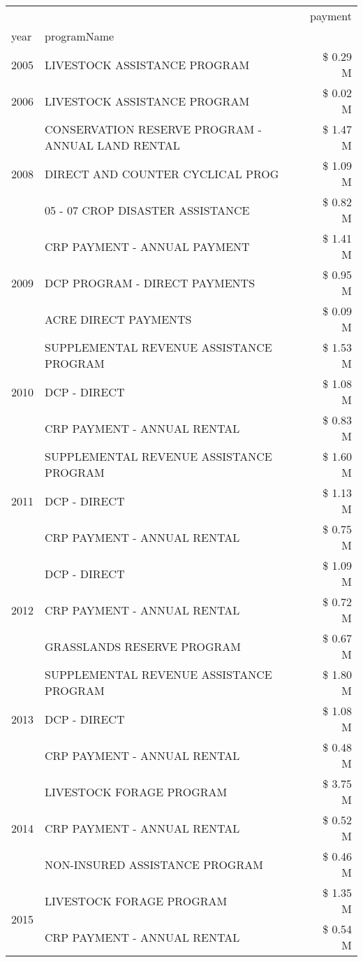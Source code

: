 \begin{tabular}{llr}
\toprule
 &  & payment \\
year & programName &  \\
\midrule
2005 & LIVESTOCK ASSISTANCE PROGRAM & \$ 0.29 M \\
\cline{1-3}
2006 & LIVESTOCK ASSISTANCE PROGRAM & \$ 0.02 M \\
\cline{1-3}
\multirow[t]{3}{*}{2008} & CONSERVATION RESERVE PROGRAM - ANNUAL LAND RENTAL & \$ 1.47 M \\
 & DIRECT AND COUNTER CYCLICAL PROG & \$ 1.09 M \\
 & 05 - 07 CROP DISASTER ASSISTANCE & \$ 0.82 M \\
\cline{1-3}
\multirow[t]{3}{*}{2009} & CRP PAYMENT - ANNUAL PAYMENT & \$ 1.41 M \\
 & DCP PROGRAM - DIRECT PAYMENTS & \$ 0.95 M \\
 & ACRE DIRECT PAYMENTS & \$ 0.09 M \\
\cline{1-3}
\multirow[t]{3}{*}{2010} & SUPPLEMENTAL REVENUE ASSISTANCE PROGRAM & \$ 1.53 M \\
 & DCP - DIRECT & \$ 1.08 M \\
 & CRP PAYMENT - ANNUAL RENTAL & \$ 0.83 M \\
\cline{1-3}
\multirow[t]{3}{*}{2011} & SUPPLEMENTAL REVENUE ASSISTANCE PROGRAM & \$ 1.60 M \\
 & DCP - DIRECT & \$ 1.13 M \\
 & CRP PAYMENT - ANNUAL RENTAL & \$ 0.75 M \\
\cline{1-3}
\multirow[t]{3}{*}{2012} & DCP - DIRECT & \$ 1.09 M \\
 & CRP PAYMENT - ANNUAL RENTAL & \$ 0.72 M \\
 & GRASSLANDS RESERVE PROGRAM & \$ 0.67 M \\
\cline{1-3}
\multirow[t]{3}{*}{2013} & SUPPLEMENTAL REVENUE ASSISTANCE PROGRAM & \$ 1.80 M \\
 & DCP - DIRECT & \$ 1.08 M \\
 & CRP PAYMENT - ANNUAL RENTAL & \$ 0.48 M \\
\cline{1-3}
\multirow[t]{3}{*}{2014} & LIVESTOCK FORAGE PROGRAM & \$ 3.75 M \\
 & CRP PAYMENT - ANNUAL RENTAL & \$ 0.52 M \\
 & NON-INSURED ASSISTANCE PROGRAM & \$ 0.46 M \\
\cline{1-3}
\multirow[t]{3}{*}{2015} & LIVESTOCK FORAGE PROGRAM & \$ 1.35 M \\
 & CRP PAYMENT - ANNUAL RENTAL & \$ 0.54 M \\

\end{tabular}
